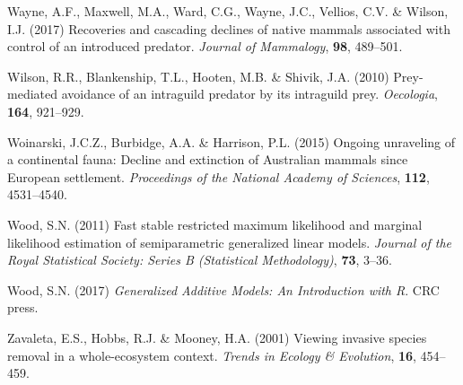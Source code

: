 \documentclass[]{elsarticle} %
\begin{document}
\leavevmode\hypertarget{ref-wayne2017recoveries}{}%
Wayne, A.F., Maxwell, M.A., Ward, C.G., Wayne, J.C., Vellios, C.V. \& Wilson, I.J. (2017) Recoveries and cascading declines of native mammals associated with control of an introduced predator. \emph{Journal of Mammalogy}, \textbf{98}, 489--501.

\leavevmode\hypertarget{ref-wilson2010prey}{}%
Wilson, R.R., Blankenship, T.L., Hooten, M.B. \& Shivik, J.A. (2010) Prey-mediated avoidance of an intraguild predator by its intraguild prey. \emph{Oecologia}, \textbf{164}, 921--929.

\leavevmode\hypertarget{ref-woinarski2015ongoing}{}%
Woinarski, J.C.Z., Burbidge, A.A. \& Harrison, P.L. (2015) Ongoing unraveling of a continental fauna: Decline and extinction of Australian mammals since European settlement. \emph{Proceedings of the National Academy of Sciences}, \textbf{112}, 4531--4540.

\leavevmode\hypertarget{ref-wood2011fast}{}%
Wood, S.N. (2011) Fast stable restricted maximum likelihood and marginal likelihood estimation of semiparametric generalized linear models. \emph{Journal of the Royal Statistical Society: Series B (Statistical Methodology)}, \textbf{73}, 3--36.

\leavevmode\hypertarget{ref-wood2017generalized}{}%
Wood, S.N. (2017) \emph{Generalized Additive Models: An Introduction with R}. CRC press.

\leavevmode\hypertarget{ref-zavaleta2001viewing}{}%
Zavaleta, E.S., Hobbs, R.J. \& Mooney, H.A. (2001) Viewing invasive species removal in a whole-ecosystem context. \emph{Trends in Ecology \& Evolution}, \textbf{16}, 454--459.
\end{document}
